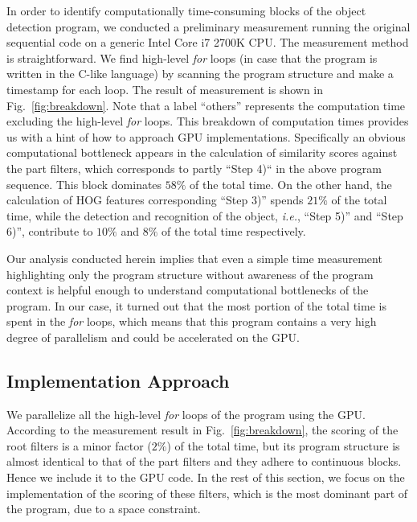 In order to identify computationally time-consuming blocks of the object
detection program, we conducted a preliminary measurement running the
original sequential code \cite{Niknejad12} on a generic Intel Core i7
2700K CPU.
The measurement method is straightforward.
We find high-level \textit{for} loops (in case that the program is
written in the C-like language) by scanning the program structure and
make a timestamp for each loop.
The result of measurement is shown in Fig.~\ref{fig:breakdown}.
Note that a label ``others'' represents the computation time excluding
the high-level \textit{for} loops.
This breakdown of computation times provides us with a hint of how to
approach GPU implementations.
Specifically an obvious computational bottleneck appears in the
calculation of similarity scores against the part filters, which
corresponds to partly ``Step 4)`` in the above program sequence.
This block dominates $58\%$ of the total time.
On the other hand, the calculation of HOG features corresponding ``Step
3)'' spends $21\%$ of the total time, while the detection and recognition
of the object, \textit{i.e.}, ``Step 5)'' and ``Step 6)'', contribute to
$10\%$ and $8\%$ of the total time respectively.

Our analysis conducted herein implies that even a simple time
measurement highlighting only the program structure without awareness of
the program context is helpful enough to understand computational
bottlenecks of the program.
In our case, it turned out that the most portion of the total time is
spent in the \textit{for} loops, which means that this program contains
a very high degree of parallelism and could be accelerated on the GPU.

\subsection{Implementation Approach}

We parallelize all the high-level \textit{for} loops of the program
using the GPU.
According to the measurement result in Fig.~\ref{fig:breakdown}, the
scoring of the root filters is a minor factor ($2\%$) of the total
time, but its program structure is almost identical to that of the part
filters and they adhere to continuous blocks.
Hence we include it to the GPU code.
In the rest of this section, we focus on the implementation of the
scoring of these filters, which is the most dominant part of the
program, due to a space constraint.


